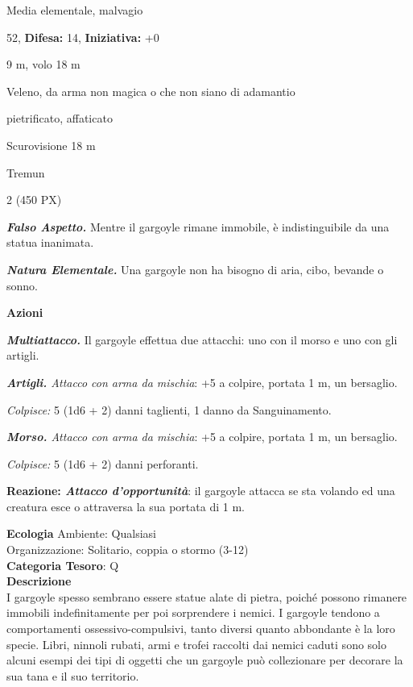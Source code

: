 \begin{multicols}{2}
{
\noindent
\begin{description}[noitemsep, topsep=0pt, parsep=0pt, partopsep=0pt, leftmargin=0cm, labelwidth=2.2cm]
	\item[\textbf{Taglia/Tipo:}] Media elementale, malvagio
	\item[\textbf{Caratt.:}] 
	\item[\textbf{Punti Ferita:}] 52,  \textbf{Difesa:} 14,  \textbf{Iniziativa:} +0
	\item[\textbf{Movimento:}] 9 m, volo 18 m
	\item[\textbf{Tiri Salvez.:}] 
	\item[\textbf{Res. Danni:}] Veleno, da arma non magica o che non siano di adamantio
	\item[\textbf{Immunità:}] pietrificato, affaticato
	\item[\textbf{Sensi:}] Scurovisione 18 m
	\item[\textbf{Linguaggi:}] Tremun
	\item[\textbf{Sfida:}] 2 (450 PX)\smallskip
\end{description}

\emph{\textbf{Falso Aspetto.}} Mentre il gargoyle rimane immobile, è indistinguibile da una statua inanimata.

\emph{\textbf{Natura Elementale.}} Una gargoyle non ha bisogno di aria, cibo, bevande o sonno.

\textbf{Azioni}

\emph{\textbf{Multiattacco.}} Il gargoyle effettua due attacchi: uno con il morso e uno con gli artigli.

\emph{\textbf{Artigli.} Attacco con arma da mischia}: +5 a colpire, portata 1 m, un bersaglio.

\emph{Colpisce:} 5 (1d6 + 2) danni taglienti, 1 danno da Sanguinamento.

\emph{\textbf{Morso.} Attacco con arma da mischia}: +5 a colpire, portata 1 m, un bersaglio.

\emph{Colpisce:} 5 (1d6 + 2) danni perforanti.

\textbf{Reazione: \emph{Attacco d'opportunità}}: il gargoyle attacca se sta volando ed una creatura esce o attraversa la sua portata di 1 m.

\textbf{Ecologia}
Ambiente: Qualsiasi\\
Organizzazione: Solitario, coppia o stormo (3-12)\\
\textbf{Categoria Tesoro}: Q\\
\textbf{Descrizione}\\
I gargoyle spesso sembrano essere statue alate di pietra, poiché possono rimanere immobili indefinitamente per poi sorprendere i nemici. I gargoyle tendono a comportamenti ossessivo-compulsivi, tanto diversi quanto abbondante è la loro specie. Libri, ninnoli rubati, armi e trofei raccolti dai nemici caduti sono solo alcuni esempi dei tipi di oggetti che un gargoyle può collezionare per decorare la sua tana e il suo territorio.

}
\end{multicols}
